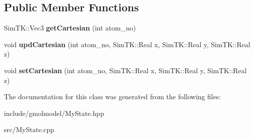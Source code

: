 \subsection*{Public Member Functions}
\begin{DoxyCompactItemize}
\item 
Sim\+T\+K\+::\+Vec3 {\bfseries get\+Cartesian} (int atom\+\_\+no)\hypertarget{classMyState_a769460770d243aa7f6e502e03a382176}{}\label{classMyState_a769460770d243aa7f6e502e03a382176}

\item 
void {\bfseries upd\+Cartesian} (int atom\+\_\+no, Sim\+T\+K\+::\+Real x, Sim\+T\+K\+::\+Real y, Sim\+T\+K\+::\+Real z)\hypertarget{classMyState_aea93f1c028d9b3b41d5a946b2bac6810}{}\label{classMyState_aea93f1c028d9b3b41d5a946b2bac6810}

\item 
void {\bfseries set\+Cartesian} (int atom\+\_\+no, Sim\+T\+K\+::\+Real x, Sim\+T\+K\+::\+Real y, Sim\+T\+K\+::\+Real z)\hypertarget{classMyState_a0b4fe1fc80f10af1430abc298c369f77}{}\label{classMyState_a0b4fe1fc80f10af1430abc298c369f77}

\end{DoxyCompactItemize}


The documentation for this class was generated from the following files\+:\begin{DoxyCompactItemize}
\item 
include/gmolmodel/My\+State.\+hpp\item 
src/My\+State.\+cpp\end{DoxyCompactItemize}
